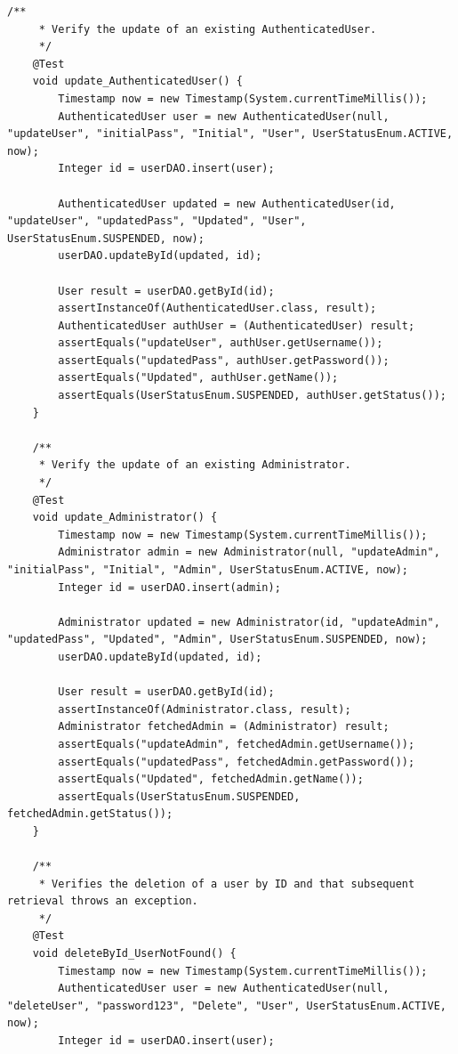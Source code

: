 \documentclass[a4paper]{article}
\begin{document}
\begin{lstlisting}[style=java-style, caption={Esempio test per la classe \texttt{UserTest.java}}]
    /**
     * Verify the update of an existing AuthenticatedUser.
     */
    @Test
    void update_AuthenticatedUser() {
        Timestamp now = new Timestamp(System.currentTimeMillis());
        AuthenticatedUser user = new AuthenticatedUser(null, "updateUser", "initialPass", "Initial", "User", UserStatusEnum.ACTIVE, now);
        Integer id = userDAO.insert(user);

        AuthenticatedUser updated = new AuthenticatedUser(id, "updateUser", "updatedPass", "Updated", "User", UserStatusEnum.SUSPENDED, now);
        userDAO.updateById(updated, id);

        User result = userDAO.getById(id);
        assertInstanceOf(AuthenticatedUser.class, result);
        AuthenticatedUser authUser = (AuthenticatedUser) result;
        assertEquals("updateUser", authUser.getUsername());
        assertEquals("updatedPass", authUser.getPassword());
        assertEquals("Updated", authUser.getName());
        assertEquals(UserStatusEnum.SUSPENDED, authUser.getStatus());
    }

    /**
     * Verify the update of an existing Administrator.
     */
    @Test
    void update_Administrator() {
        Timestamp now = new Timestamp(System.currentTimeMillis());
        Administrator admin = new Administrator(null, "updateAdmin", "initialPass", "Initial", "Admin", UserStatusEnum.ACTIVE, now);
        Integer id = userDAO.insert(admin);

        Administrator updated = new Administrator(id, "updateAdmin", "updatedPass", "Updated", "Admin", UserStatusEnum.SUSPENDED, now);
        userDAO.updateById(updated, id);

        User result = userDAO.getById(id);
        assertInstanceOf(Administrator.class, result);
        Administrator fetchedAdmin = (Administrator) result;
        assertEquals("updateAdmin", fetchedAdmin.getUsername());
        assertEquals("updatedPass", fetchedAdmin.getPassword());
        assertEquals("Updated", fetchedAdmin.getName());
        assertEquals(UserStatusEnum.SUSPENDED, fetchedAdmin.getStatus());
    }

    /**
     * Verifies the deletion of a user by ID and that subsequent retrieval throws an exception.
     */
    @Test
    void deleteById_UserNotFound() {
        Timestamp now = new Timestamp(System.currentTimeMillis());
        AuthenticatedUser user = new AuthenticatedUser(null, "deleteUser", "password123", "Delete", "User", UserStatusEnum.ACTIVE, now);
        Integer id = userDAO.insert(user);


\end{lstlisting}
\end{document}
